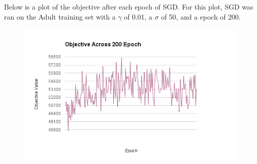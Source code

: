 \documentclass[11pt]{article}
\begin{document}
Below is a plot of the objective after each epoch of SGD. For this plot, SGD was ran on the Adult training set with a $\gamma$ of 0.01, a $\sigma$ of 50, and a epoch of 200.

\begin{figure}[H]
  \centerline{\includegraphics[width=1\linewidth]{objective.png}}
\end{figure}
\end{document}
